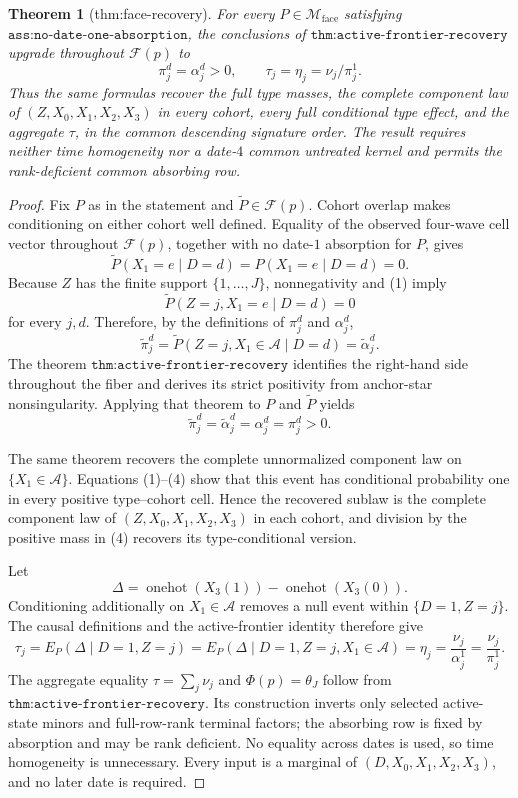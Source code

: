 \documentclass{article}
\newtheorem{theorem}{Theorem}
\begin{document}
\begin{theorem}[thm:face-recovery]\label{thm:face-recovery}
For every \(P\in\mathcal M_{\mathrm{face}}\) satisfying \(\texttt{ass:no-date-one-absorption}\), the conclusions of \(\texttt{thm:active-frontier-recovery}\) upgrade throughout \(\mathcal F(p)\) to
\[
 \pi_j^d=\alpha_j^d>0,\qquad \tau_j=\eta_j=\nu_j/\pi_j^1.
\]
Thus the same formulas recover the full type masses, the complete component law of \((Z,X_0,X_1,X_2,X_3)\) in every cohort, every full conditional type effect, and the aggregate \(\tau\), in the common descending signature order. The result requires neither time homogeneity nor a date-\(4\) common untreated kernel and permits the rank-deficient common absorbing row.
\end{theorem}
\begin{proof}
Fix \(P\) as in the statement and \(\widetilde P\in\mathcal F(p)\).  Cohort overlap makes conditioning on either cohort well defined.  Equality of the observed four-wave cell vector throughout \(\mathcal F(p)\), together with no date-\(1\) absorption for \(P\), gives
\[
 \widetilde P(X_1=e\mid D=d)=P(X_1=e\mid D=d)=0.
\tag{1}
\]
Because \(Z\) has the finite support \(\{1,\ldots,J\}\), nonnegativity and (1) imply
\[
 \widetilde P(Z=j,X_1=e\mid D=d)=0
\tag{2}
\]
for every \(j,d\).  Therefore, by the definitions of \(\pi_j^d\) and \(\alpha_j^d\),
\[
 \widetilde\pi_j^d
 =\widetilde P(Z=j,X_1\in\mathcal A\mid D=d)
 =\widetilde\alpha_j^d.
\tag{3}
\]
The theorem \(\texttt{thm:active-frontier-recovery}\) identifies the right-hand side throughout the fiber and derives its strict positivity from anchor-star nonsingularity.  Applying that theorem to \(P\) and \(\widetilde P\) yields
\[
 \widetilde\pi_j^d=\widetilde\alpha_j^d
 =\alpha_j^d=\pi_j^d>0.
\tag{4}
\]

The same theorem recovers the complete unnormalized component law on \(\{X_1\in\mathcal A\}\).  Equations (1)--(4) show that this event has conditional probability one in every positive type--cohort cell.  Hence the recovered sublaw is the complete component law of \((Z,X_0,X_1,X_2,X_3)\) in each cohort, and division by the positive mass in (4) recovers its type-conditional version.

Let
\[
 \Delta=\operatorname{onehot}(X_3(1))-\operatorname{onehot}(X_3(0)).
\]
Conditioning additionally on \(X_1\in\mathcal A\) removes a null event within \(\{D=1,Z=j\}\).  The causal definitions and the active-frontier identity therefore give
\[
 \tau_j=E_P(\Delta\mid D=1,Z=j)
 =E_P(\Delta\mid D=1,Z=j,X_1\in\mathcal A)
 =\eta_j=\frac{\nu_j}{\alpha_j^1}
 =\frac{\nu_j}{\pi_j^1}.
\tag{5}
\]
The aggregate equality \(\tau=\sum_j\nu_j\) and \(\Phi(p)=\theta_J\) follow from \(\texttt{thm:active-frontier-recovery}\).  Its construction inverts only selected active-state minors and full-row-rank terminal factors; the absorbing row is fixed by absorption and may be rank deficient.  No equality across dates is used, so time homogeneity is unnecessary.  Every input is a marginal of \((D,X_0,X_1,X_2,X_3)\), and no later date is required.
\end{proof}
\end{document}
